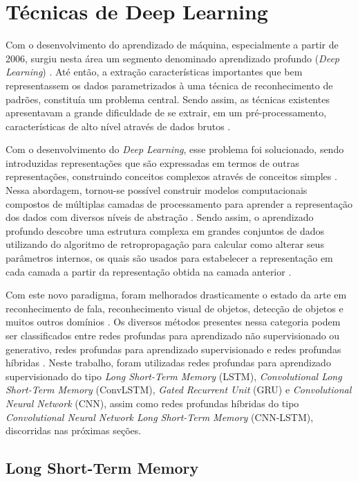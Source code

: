 \section{Técnicas de Deep Learning}

Com o desenvolvimento do aprendizado de máquina, especialmente a partir de 2006, surgiu nesta área um segmento denominado aprendizado profundo (\textit{Deep Learning}) \cite{Deng2014}. Até então, a extração características importantes que bem representassem os dados parametrizados à uma técnica de reconhecimento de padrões, constituía um problema central. Sendo assim, as técnicas existentes apresentavam a grande dificuldade de se extrair, em um pré-processamento, características de alto nível através de dados brutos \cite{Goodfellow2016}. 

Com o desenvolvimento do \textit{Deep Learning}, esse problema foi solucionado, sendo introduzidas representações que são expressadas em termos de outras representações, construindo conceitos complexos através de conceitos simples \cite{Goodfellow2016}. Nessa abordagem, tornou-se possível construir modelos computacionais compostos de múltiplas camadas de processamento para aprender a representação dos dados com diversos níveis de abstração \cite{LeCun2015}. Sendo assim, o aprendizado profundo descobre uma estrutura complexa em grandes conjuntos de dados utilizando do algoritmo de retropropagação para calcular como alterar seus parâmetros internos, os quais são usados para estabelecer a representação em cada camada a partir da representação obtida na camada anterior \cite{LeCun2015}.

Com este novo paradigma, foram melhorados drasticamente o estado da arte em reconhecimento de fala, reconhecimento visual de objetos, detecção de objetos e muitos outros domínios \cite{LeCun2015}. Os diversos métodos presentes nessa categoria podem ser classificados entre redes profundas para aprendizado não supervisionado ou generativo, redes profundas para aprendizado supervisionado e redes profundas híbridas \cite{Deng2014}. Neste trabalho, foram utilizadas redes  profundas para aprendizado supervisionado do tipo \textit{Long Short-Term Memory} (LSTM), \textit{Convolutional Long Short-Term Memory} (ConvLSTM), \textit{Gated Recurrent Unit} (GRU)  e \textit{Convolutional Neural Network} (CNN), assim como redes profundas híbridas do tipo \textit{Convolutional Neural Network Long Short-Term Memory} (CNN-LSTM), discorridas nas próximas seções.

\subsection{Long Short-Term Memory}


